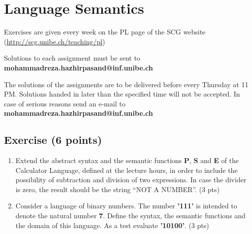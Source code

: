 \documentclass [11pt, a4wide, twoside]{article}
\begin{document}
\section*{\space{} Language Semantics}


\begin{myitemize}
\item Exercises are given every week on the PL page of the SCG website \\ (\url{http://scg.unibe.ch/teaching/pl})
\item Solutions to each assignment must be sent to \textbf{mohammadreza.hazhirpasand@inf.unibe.ch}
\item The solutions of the assignments are to be delivered before every Thursday at 11 PM. Solutions handed in later than the specified time will not be accepted. In case of serious reasons send an e-mail to  \textbf{mohammadreza.hazhirpasand@inf.unibe.ch}
\end{myitemize}


\subsection*{Exercise (6 points)}


\begin{enumerate}
\item Extend the abstract syntax and the semantic functions \textbf{P}, \textbf{S} and \textbf{E} of the Calculator Language, defined at the lecture hours, in order to include the possibility of subtraction and division of two expressions. In case the divider is zero, the result should be the string ``NOT A NUMBER''.  (3 pts)

\vspace{0.5cm}
\solution{}



\item Consider a language of binary numbers. The number \textbf{'111'} is intended to denote the natural number \textbf{7}. Define the syntax, the semantic functions and the domain of this language. As a test evaluate \textbf{'10100'}. (3 pts)

\vspace{0.5cm}
\solution{}
\end{enumerate}
\end{document}
